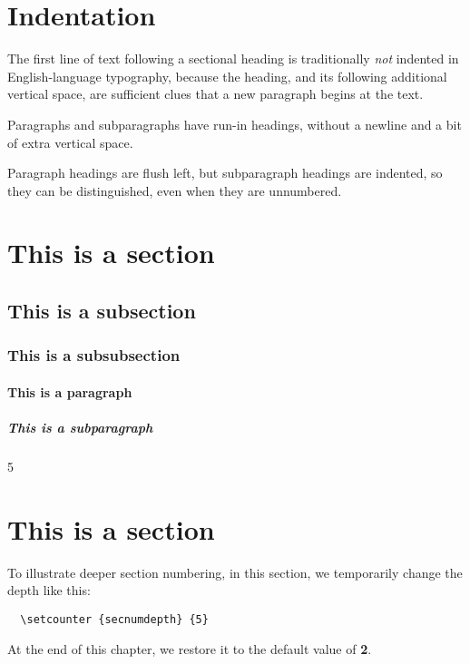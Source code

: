 \section{Indentation}

The first line of text following a sectional heading is traditionally
\emph{not} indented in English-language typography, because the
heading, and its following additional vertical space, are sufficient
clues that a new paragraph begins at the text.

Paragraphs and subparagraphs have run-in headings, without a newline
and a bit of extra vertical space.

Paragraph headings are flush left, but subparagraph headings are
indented, so they can be distinguished, even when they are unnumbered.

\section{This is a section}

\blah

\subsection{This is a subsection}

\blah

\subsubsection{This is a subsubsection}

\blah

\paragraph{This is a paragraph}

\blah

\subparagraph{This is a subparagraph}

\blah


\setcounter {secnumdepth} {5}

\section{This is a section}

To illustrate deeper section numbering, in this section, we
temporarily change the depth like this:
%
\begin{verbatim}
  \setcounter {secnumdepth} {5}
\end{verbatim}
%
At the end of this chapter, we restore it to the default value of
\textbf{2}.

